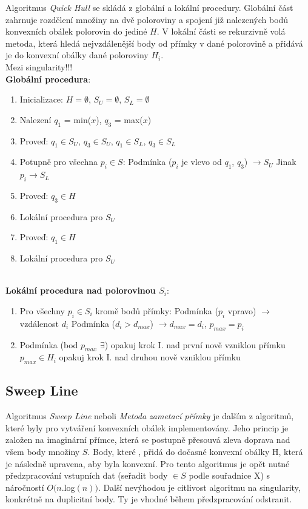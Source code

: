 \documentclass[a4paper, 12pt]{article}
\begin{document}
Algoritmus \textit{Quick Hull} se skládá z globální a lokální procedury. Globální část zahrnuje rozdělení množiny na dvě poloroviny a spojení již nalezených bodů konvexních obálek polorovin do jediné $H$. V lokální části se rekurzivně volá metoda, která hledá nejvzdálenější body od přímky v dané polorovině a přidává je do konvexní obálky dané poloroviny $H_i$.\\

Mezi singularity!!!\\

\textbf{Globální procedura}:
\begin{enumerate}
\item Inicializace: $H = \emptyset$, $S_U = \emptyset$, $S_L = \emptyset$ 
\item Nalezení $q_1$ = min($x$), $q_3$ = max($x$)
\item Proveď: $q_1 \in S_U$, $q_3 \in S_U$, $q_1 \in S_L$, $q_3 \in S_L$
\item Potupně pro všechna $p_i \in S$:
\subitem Podmínka ($p_i$ je vlevo od $q_1$, $q_3$) $\rightarrow S_U$
\subitem Jinak $ p_i \rightarrow S_L$
\item Proveď: $q_3 \in H$
\item Lokální procedura pro $S_U$
\item Proveď: $q_1 \in H$
\item Lokální procedura pro $S_U$
\end{enumerate}
~\\
\textbf{Lokální procedura nad polorovinou $S_i$}:
\begin{enumerate}[label=\Roman*.]
\item Pro všechny $p_i \in S_i$ kromě bodů přímky:
\subitem Podmínka ($p_i$ vpravo) $\rightarrow$ vzdálenost $d_i$
\subsubitem Podmínka ($d_i > d_{max}$) $\rightarrow d_{max} = d_i$, $p_{max} = p_i$
\item Podmínka (bod $p_{max}$ $\exists$) 
\subitem opakuj krok I. nad první nově vzniklou přímku
\subitem $p_{max} \in H_i$
\subitem opakuj krok I. nad druhou nově vzniklou přímku
\end{enumerate}

\subsection{Sweep Line}
Algoritmus \textit{Sweep Line} neboli \textit{Metoda zametací přímky} je dalším z algoritmů, které byly pro vytváření konvexních obálek implementovány. Jeho princip je založen na imaginární přímce, která se postupně přesouvá zleva doprava nad všem body množiny $S$. Body, které , přidá do dočasné konvexní obálky \={H}, která je následně upravena, aby byla konvexní. Pro tento algoritmus je opět nutné předzpracování vstupních dat (seřadit body $\in S$ podle souřadnice X) s náročností $O(n.$log$(n))$. Další nevýhodou je citlivost algoritmu na singularity, konkrétně na duplicitní body. Ty je vhodné během předzpracování odstranit.\\ 
\end{document}
